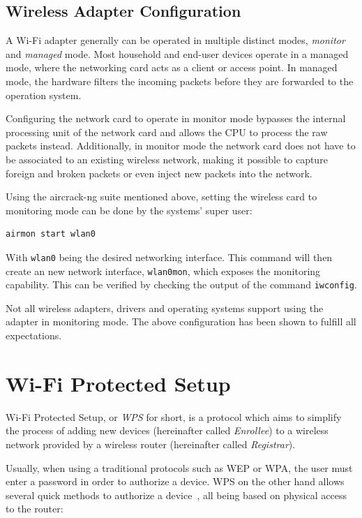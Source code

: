 \subsection{Wireless Adapter Configuration}\label{sec:wificonf}

A Wi-Fi adapter generally can be operated in multiple distinct modes, \emph{monitor} and \emph{managed} mode. Most household and end-user devices operate in a managed mode, where the networking card acts as a client or access point. In managed mode, the hardware filters the incoming packets before they are forwarded to the operation system. 

Configuring the network card to operate in monitor mode bypasses the internal processing unit of the network card and allows the CPU to process the raw packets instead. Additionally, in monitor mode the network card does not have to be associated to an existing wireless network, making it possible to capture foreign and broken packets or even inject new packets into the network.

Using the aircrack-ng suite mentioned above, setting the wireless card to monitoring mode can be done by the systems' super user:

\begin{lstlisting}
airmon start wlan0
\end{lstlisting}

With \lstinline{wlan0} being the desired networking interface. This command will then create an new network interface, \lstinline{wlan0mon}, which exposes the monitoring capability. This can be verified by checking the output of the command \lstinline{iwconfig}.

Not all wireless adapters, drivers and operating systems support using the adapter in monitoring mode. The above configuration has been shown to fulfill all expectations.

\section{Wi-Fi Protected Setup}\label{sec:wps}

Wi-Fi Protected Setup, or \emph{WPS} for short, is a protocol which aims to simplify the process of adding new devices (hereinafter called \emph{Enrollee}) to a wireless network provided by a wireless router (hereinafter called \emph{Registrar}). 

Usually, when using a traditional protocols such as WEP or WPA, the user must enter a password in order to authorize a device. WPS on the other hand allows several quick methods to authorize a device~\cite{WiFi11}, all being based on physical access to the router:

